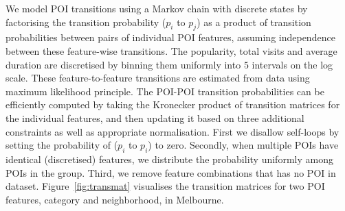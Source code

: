 We model POI transitions using a Markov chain with discrete %
states by factorising the transition probability ($p_i$ to $p_j$) %
as a product of transition probabilities between pairs of individual POI features, %
assuming independence between these feature-wise transitions.
The popularity, total visits and average duration are discretised by binning
them uniformly into $5$ intervals on the log scale.
These feature-to-feature transitions are estimated from data using maximum likelihood principle.
The POI-POI transition probabilities can be efficiently computed by taking the Kronecker product of 
transition matrices for the individual features,
and then updating it based on three additional constraints as well as appropriate normalisation.
First we disallow self-loops by setting the probability of ($p_i$ to $p_i$) to zero.
Secondly, when multiple POIs have identical (discretised) features, we distribute the probability uniformly among POIs in the group.
Third, we remove feature combinations that has no POI in dataset. 
Figure~\ref{fig:transmat} visualises the transition matrices for two POI features, category and neighborhood, in Melbourne.
